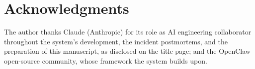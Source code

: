 \section*{Acknowledgments}

The author thanks Claude (Anthropic) for its role as AI engineering
collaborator throughout the system's development, the incident
postmortems, and the preparation of this manuscript, as disclosed on the
title page; and the OpenClaw open-source community, whose framework the
system builds upon.
